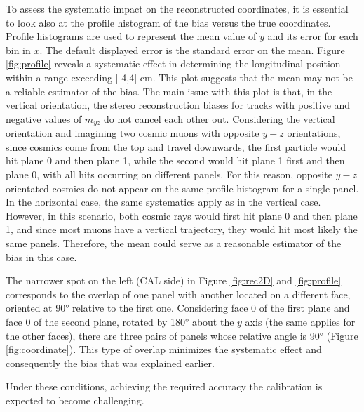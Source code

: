 To assess the systematic impact on the reconstructed coordinates, it is essential 
to look also at the profile histogram of the bias versus the true coordinates. 
Profile histograms are used to represent the mean value of $y$ and its error for each bin in $x$. 
The default displayed error is the standard error on the mean. 
Figure \ref{fig:profile} reveals a systematic effect in determining the 
longitudinal position within a range exceeding [-4,4] cm. 
This plot suggests that the mean may not be a reliable estimator 
of the bias. The main issue with this plot is that, in the vertical orientation, the stereo 
reconstruction biases for tracks with positive and negative values of 
$m_{yz}$ do not cancel each other out.
Considering the vertical orientation and imagining two cosmic muons  
with opposite $y-z$ orientations, since cosmics come from the top and travel 
downwards, the first particle would hit plane 0 and then plane 1, while the second 
would hit plane 1 first and then plane 0, with all hits occurring on different 
panels. For this reason, opposite $y-z$ orientated cosmics do not appear on the same profile 
histogram for a single panel. In the horizontal case, the same systematics apply as in the vertical case. 
However, in this scenario, both cosmic rays would first hit plane 0 and then 
plane 1, and since most muons have a vertical trajectory, they would hit most likely  
the same panels. Therefore, the mean could serve as a reasonable estimator of the bias in this case.

The narrower spot on the left (CAL side) in Figure \ref{fig:rec2D} and \ref{fig:profile} 
corresponds to the overlap of one panel with another located 
on a different face, oriented at 90° relative to the first one. 
Considering face 0 of the first plane and face 0 of the second plane, 
rotated by 180° about the $y$ axis (the same applies for the other faces), 
there are three pairs of panels whose relative angle is 90° (Figure \ref{fig:coordinate}). 
This type of overlap minimizes the systematic effect and consequently the bias that was explained earlier.

Under these conditions, achieving the required accuracy 
 the calibration is expected to become challenging. 


  
